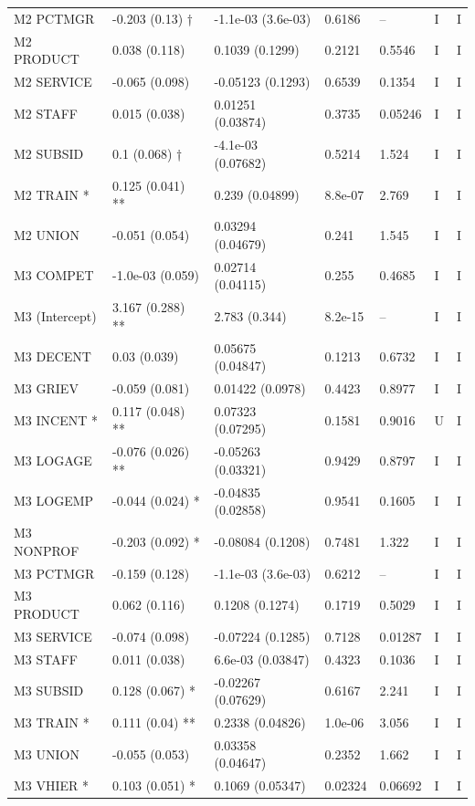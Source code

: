 {\begin{longtable}{@{}p{.245\linewidth}p{.17\linewidth}p{.17\linewidth}p{.085\linewidth}p{.060\linewidth}p{.08\linewidth}p{.07\linewidth}@{}}
M2 PCTMGR & -0.203 (0.13) † & -1.1e-03 (3.6e-03) & 0.6186 & -- & I & I\\
M2 PRODUCT & 0.038 (0.118) & 0.1039 (0.1299) & 0.2121 & 0.5546 & I & I\\
M2 SERVICE & -0.065 (0.098) & -0.05123 (0.1293) & 0.6539 & 0.1354 & I & I\\
M2 STAFF & 0.015 (0.038) & 0.01251 (0.03874) & 0.3735 & 0.05246 & I & I\\
M2 SUBSID & 0.1 (0.068) † & -4.1e-03 (0.07682) & 0.5214 & 1.524 & I & I\\
M2 TRAIN * & 0.125 (0.041) ** & 0.239 (0.04899) & 8.8e-07 & 2.769 & I & I\\
M2 UNION & -0.051 (0.054) & 0.03294 (0.04679) & 0.241 & 1.545 & I & I\\
M3 COMPET & -1.0e-03 (0.059) & 0.02714 (0.04115) & 0.255 & 0.4685 & I & I\\
M3 (Intercept) & 3.167 (0.288) ** & 2.783 (0.344) & 8.2e-15 & -- & I & I\\
M3 DECENT & 0.03 (0.039) & 0.05675 (0.04847) & 0.1213 & 0.6732 & I & I\\
M3 GRIEV & -0.059 (0.081) & 0.01422 (0.0978) & 0.4423 & 0.8977 & I & I\\
M3 INCENT * & 0.117 (0.048) ** & 0.07323 (0.07295) & 0.1581 & 0.9016 & U & I\\
M3 LOGAGE & -0.076 (0.026) ** & -0.05263 (0.03321) & 0.9429 & 0.8797 & I & I\\
M3 LOGEMP & -0.044 (0.024) * & -0.04835 (0.02858) & 0.9541 & 0.1605 & I & I\\
M3 NONPROF & -0.203 (0.092) * & -0.08084 (0.1208) & 0.7481 & 1.322 & I & I\\
M3 PCTMGR & -0.159 (0.128) & -1.1e-03 (3.6e-03) & 0.6212 & -- & I & I\\
M3 PRODUCT & 0.062 (0.116) & 0.1208 (0.1274) & 0.1719 & 0.5029 & I & I\\
M3 SERVICE & -0.074 (0.098) & -0.07224 (0.1285) & 0.7128 & 0.01287 & I & I\\
M3 STAFF & 0.011 (0.038) & 6.6e-03 (0.03847) & 0.4323 & 0.1036 & I & I\\
M3 SUBSID & 0.128 (0.067) * & -0.02267 (0.07629) & 0.6167 & 2.241 & I & I\\
M3 TRAIN * & 0.111 (0.04) ** & 0.2338 (0.04826) & 1.0e-06 & 3.056 & I & I\\
M3 UNION & -0.055 (0.053) & 0.03358 (0.04647) & 0.2352 & 1.662 & I & I\\
M3 VHIER * & 0.103 (0.051) * & 0.1069 (0.05347) & 0.02324 & 0.06692 & I & I\\

\end{longtable}}
